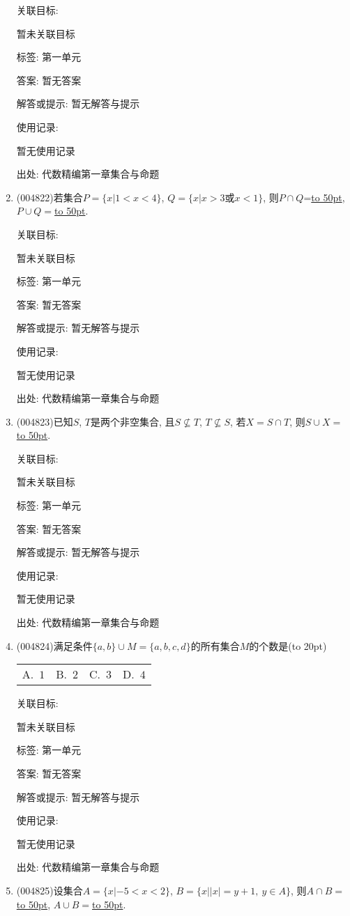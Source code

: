 \documentclass[10pt,a4paper]{article}
\newcommand{\blank}[1]{\underline{\hbox to #1pt{}}}
\newcommand{\bracket}[1]{(\hbox to #1pt{})}
\newcommand{\fourch}[4]{\par\begin{tabular}{p{.23\textwidth}p{.23\textwidth}p{.23\textwidth}p{.23\textwidth}}
A.~#1 &B.~#2& C.~#3& D.~#4
\end{tabular}}
\begin{document}
\begin{enumerate}[1.]
关联目标:

暂未关联目标



标签: 第一单元

答案: 暂无答案

解答或提示: 暂无解答与提示

使用记录:

暂无使用记录


出处: 代数精编第一章集合与命题
\item { (004822)}若集合$P=\{x|1<x<4\}$, $Q=\{x|x>3\text{或}x<1\}$, 则$P\cap Q$=\blank{50}, $P\cup Q=$\blank{50}.


关联目标:

暂未关联目标



标签: 第一单元

答案: 暂无答案

解答或提示: 暂无解答与提示

使用记录:

暂无使用记录


出处: 代数精编第一章集合与命题
\item { (004823)}已知$S$, $T$是两个非空集合, 且$S\not\subseteq T$, $T\not\subseteq S$, 若$X=S\cap T$, 则$S\cup X=$\blank{50}.


关联目标:

暂未关联目标



标签: 第一单元

答案: 暂无答案

解答或提示: 暂无解答与提示

使用记录:

暂无使用记录


出处: 代数精编第一章集合与命题
\item { (004824)}满足条件$\{a,b\}\cup M=\{a,b,c,d\}$的所有集合$M$的个数是\bracket{20}
\fourch{$1$}{$2$}{$3$}{$4$}


关联目标:

暂未关联目标



标签: 第一单元

答案: 暂无答案

解答或提示: 暂无解答与提示

使用记录:

暂无使用记录


出处: 代数精编第一章集合与命题
\item { (004825)}设集合$A=\{x|-5<x<2\}$, $B=\{x||x|=y+1, \ y\in A\}$, 则$A\cap B=$\blank{50}, $A\cup B=$\blank{50}.



\end{enumerate}
\end{document}

